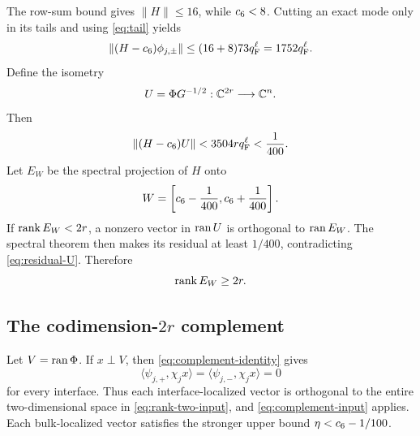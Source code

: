 The row-sum bound gives \(\|H\|\leq16\), while \(c_6<8\).  Cutting an
exact mode only in its tails and using \eqref{eq:tail} yields
\begin{equation}
 \|(H-c_6)\phi_{j,\pm}\|
 \leq(16+8)73q_{\mathrm F}^\ell=1752q_{\mathrm F}^\ell.
 \label{eq:residual-column}
\end{equation}
Define the isometry
\begin{equation}
 U=\Phi G^{-1/2}:\mathbb C^{2r}\longrightarrow\mathbb C^n.
 \label{eq:U}
\end{equation}
Then
\begin{equation}
 \|(H-c_6)U\|<3504rq_{\mathrm F}^\ell<\frac1{400}.
 \label{eq:residual-U}
\end{equation}
Let \(E_W\) be the spectral projection of \(H\) onto
\begin{equation}
 W=\left[c_6-\frac1{400},c_6+\frac1{400}\right].
 \label{eq:window}
\end{equation}
If \(\operatorname{rank} E_W<2r\), a nonzero vector in \(\operatorname{ran} U\) is orthogonal to
\(\operatorname{ran} E_W\).  The spectral theorem then makes its residual at least
\(1/400\), contradicting \eqref{eq:residual-U}.  Therefore
\begin{equation}
 \operatorname{rank} E_W\geq2r.
 \label{eq:lower-count}
\end{equation}

\subsection{The codimension-\texorpdfstring{\(2r\)}{2r} complement}

Let \(V=\operatorname{ran}\Phi\).  If \(x\perp V\), then
\eqref{eq:complement-identity} gives
\[
 \langle\psi_{j,+},\chi_jx\rangle
 =\langle\psi_{j,-},\chi_jx\rangle=0
\]
for every interface.  Thus each interface-localized vector is orthogonal to
the entire two-dimensional space in \eqref{eq:rank-two-input}, and
\eqref{eq:complement-input} applies.  Each bulk-localized vector satisfies
the stronger upper bound \(\eta<c_6-1/100\).

